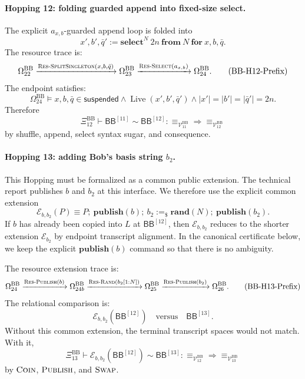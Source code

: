 \documentclass{report}
\theoremstyle{defn_style}
\providecommand{\Live}{\operatorname{Live}}
\providecommand{\HopBB}[1]{\mathsf{BB}^{[#1]}}
\begin{document}
\paragraph{Hopping 12: folding guarded append into fixed-size select.}
The explicit \(a_{x,b}\)-guarded append loop is folded into
\[
x',b',\bar q'
:=
\mathbf{select}^{N}\ 2n\
\mathbf{from}\ N\
\mathbf{for}\ x,b,\bar q.
\]
The resource trace is:
\[
\Omega^{\mathrm{BB}}_{22}
\xrightarrow{\textsc{Res-SplitSingleton}(x,b,\bar q)}
\Omega^{\mathrm{BB}}_{23}
\xrightarrow{\textsc{Res-Select}(a_{x,b})}
\Omega^{\mathrm{BB}}_{24}.
\tag{BB-H12-Prefix}\label{BB-H12-Prefix}
\]
The endpoint satisfies:
\[
\Omega^{\mathrm{BB}}_{24}
\models
x,b,\bar q\in\mathsf{suspended}
\land
\Live(x',b',\bar q')
\land
|x'|=|b'|=|\bar q'|=2n.
\tag{BB-H12-SelectReq}
\]
Therefore
\[
\Xi^{\mathrm{BB}}_{12}
\vdash
\HopBB{11}\sim\HopBB{12}:
\equiv_{\mathcal V^{\mathrm{BB}}_{11}}
\Longrightarrow
\equiv_{\mathcal V^{\mathrm{BB}}_{12}}
\tag{BB-H12-Rel}\label{BB-H12-Rel}
\]
by shuffle, append, select syntax sugar, and consequence.

\paragraph{Hopping 13: adding Bob's basis string \(b_2\).}
This Hopping must be formalized as a common public extension.  The technical
report publishes \(b\) and \(b_2\) at this interface.  We therefore use the
explicit common extension
\[
\mathcal E_{b,b_2}(P)
\equiv
P;\ \mathbf{publish}(b);\ 
b_2:=_\$\mathbf{rand}(N);\ \mathbf{publish}(b_2).
\tag{BB-H13-PublicExtDef}
\]
If \(b\) has already been copied into \(L\) at \(\HopBB{12}\), then
\(\mathcal E_{b,b_2}\) reduces to the shorter extension
\(\mathcal E_{b_2}\) by endpoint transcript alignment.  In the canonical
certificate below, we keep the explicit \(\mathbf{publish}(b)\) command so that
there is no ambiguity.

The resource extension trace is:
\[
\Omega^{\mathrm{BB}}_{24}
\xrightarrow{\textsc{Res-Publish}(b)}
\Omega^{\mathrm{BB}}_{24b}
\xrightarrow{\textsc{Res-Rand}(b_2[1{:}N])}
\Omega^{\mathrm{BB}}_{25}
\xrightarrow{\textsc{Res-Publish}(b_2)}
\Omega^{\mathrm{BB}}_{26}.
\tag{BB-H13-Prefix}\label{BB-H13-Prefix}
\]
The relational comparison is:
\[
\mathcal E_{b,b_2}(\HopBB{12})
\quad\text{versus}\quad
\HopBB{13}.
\tag{BB-H13-OutputCompatible}
\]
Without this common extension, the terminal transcript spaces would not match.
With it,
\[
\Xi^{\mathrm{BB}}_{13}
\vdash
\mathcal E_{b,b_2}(\HopBB{12})\sim\HopBB{13}:
\equiv_{\mathcal V^{\mathrm{BB}}_{12}}
\Longrightarrow
\equiv_{\mathcal V^{\mathrm{BB}}_{13}}
\tag{BB-H13-Rel}\label{BB-H13-Rel}
\]
by \(\textsc{Coin}\), \(\textsc{Publish}\), and \(\textsc{Swap}\).
\end{document}
